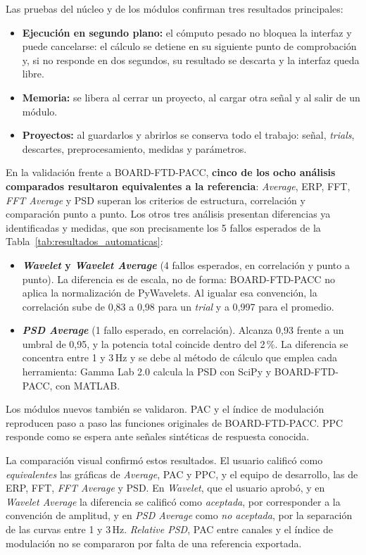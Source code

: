 \documentclass[12pt,letterpaper,oneside]{article}
\begin{document}
Las pruebas del núcleo y de los módulos confirman tres resultados principales:

\begin{itemize}
  \item \textbf{Ejecución en segundo plano:} el cómputo pesado no bloquea la interfaz y puede cancelarse: el cálculo se detiene en su siguiente punto de comprobación y, si no responde en dos segundos, su resultado se descarta y la interfaz queda libre.
  \item \textbf{Memoria:} se libera al cerrar un proyecto, al cargar otra señal y al salir de un módulo.
  \item \textbf{Proyectos:} al guardarlos y abrirlos se conserva todo el trabajo: señal, \textit{trials}, descartes, preprocesamiento, medidas y parámetros.
\end{itemize}

En la validación frente a BOARD-FTD-PACC, \textbf{cinco de los ocho análisis comparados resultaron equivalentes a la referencia}: \textit{Average}, ERP, FFT, \textit{FFT Average} y PSD superan los criterios de estructura, correlación y comparación punto a punto. Los otros tres análisis presentan diferencias ya identificadas y medidas, que son precisamente los 5 fallos esperados de la Tabla~\ref{tab:resultados_automaticas}:

\begin{itemize}
  \item \textbf{\textit{Wavelet} y \textit{Wavelet Average}} (4 fallos esperados, en correlación y punto a punto). La diferencia es de escala, no de forma: BOARD-FTD-PACC no aplica la normalización de PyWavelets. Al igualar esa convención, la correlación sube de 0,83 a 0,98 para un \textit{trial} y a 0,997 para el promedio.
  \item \textbf{\textit{PSD Average}} (1 fallo esperado, en correlación). Alcanza 0,93 frente a un umbral de 0,95, y la potencia total coincide dentro del 2\,\%. La diferencia se concentra entre 1 y 3\,Hz y se debe al método de cálculo que emplea cada herramienta: Gamma Lab 2.0 calcula la PSD con SciPy y BOARD-FTD-PACC, con MATLAB.
\end{itemize}

Los módulos nuevos también se validaron. PAC y el índice de modulación reproducen paso a paso las funciones originales de BOARD-FTD-PACC. PPC responde como se espera ante señales sintéticas de respuesta conocida.

La comparación visual confirmó estos resultados. El usuario calificó como \textit{equivalentes} las gráficas de \textit{Average}, PAC y PPC, y el equipo de desarrollo, las de ERP, FFT, \textit{FFT Average} y PSD. En \textit{Wavelet}, que el usuario aprobó, y en \textit{Wavelet Average} la diferencia se calificó como \textit{aceptada}, por corresponder a la convención de amplitud, y en \textit{PSD Average} como \textit{no aceptada}, por la separación de las curvas entre 1 y 3\,Hz. \textit{Relative PSD}, PAC entre canales y el índice de modulación no se compararon por falta de una referencia exportada.
\end{document}
